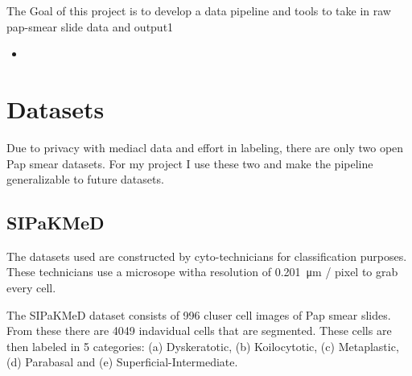 \documentclass[ms,electronic,oneside,twosidetoc,letterpaper,chaptercenter,parttop]{byumsphd}
\begin{document}
The Goal of this project is to develop a data pipeline and tools to take in raw pap-smear slide data and output1
\begin{itemize}
  \item 
\end{itemize}

\chapter{Datasets}

Due to privacy with mediacl data and effort in labeling, there are only two open Pap smear datasets. For my project I use these two and make the pipeline generalizable
to future datasets.


\section{SIPaKMeD}
The datasets used are constructed by cyto-technicians for classification purposes. These technicians use a microsope witha resolution of  \SI{0.201}{\micro\metre} / pixel to grab every cell.

The SIPaKMeD dataset consists of 996 cluser cell images of Pap smear slides. From these there are
4049 indavidual cells that are segmented. These cells are then labeled in 5 categories: 
(a) Dyskeratotic, (b) Koilocytotic, (c) Metaplastic, (d) Parabasal and (e) Superficial-Intermediate.
\end{document}
